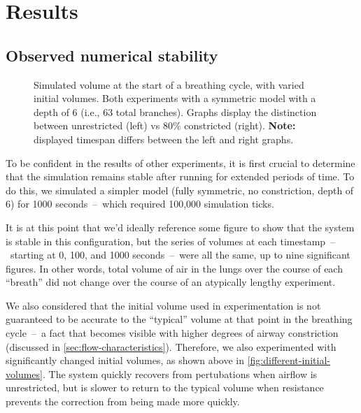 %
\section{Results} \label{sec:results}

\subsection{Observed numerical stability}

\begin{figure}[ht!]
    \centering
    \begin{tikzpicture}[scale=0.8]
        
        
    \end{tikzpicture}
    \caption{
        Simulated volume at the start of a breathing cycle, with varied initial volumes. Both
        experiments with a symmetric model with a depth of 6 (i.e., 63 total branches). Graphs
        display the distinction between unrestricted (left) vs 80\% constricted (right).
        \textbf{Note:} displayed timespan differs between the left and right graphs.
    }
    \label{fig:different-initial-volumes}
\end{figure}

To be confident in the results of other experiments, it is first crucial to determine that the
simulation remains stable after running for extended periods of time. To do this, we simulated a
simpler model (fully symmetric, no constriction, depth of 6) for 1000 seconds~--~which required
100,000 simulation ticks.

It is at this point that we'd ideally reference some figure to show that the system is stable in
this configuration, but the series of volumes at each timestamp~--~starting at 0, 100, and 1000
seconds~--~were all the same, up to nine significant figures. In other words, total volume of air in
the lungs over the course of each ``breath'' did not change over the course of an atypically lengthy
experiment.

\breakpars

We also considered that the initial volume used in experimentation is not guaranteed to be accurate
to the ``typical'' volume at that point in the breathing cycle~--~a fact that becomes visible with
higher degrees of airway constriction (discussed in \autoref{sec:flow-characteristics}). Therefore,
we also experimented with significantly changed initial volumes, as shown above in
\autoref{fig:different-initial-volumes}. The system quickly recovers from pertubations when airflow
is unrestricted, but is slower to return to the typical volume when resistance prevents the
correction from being made more quickly.

